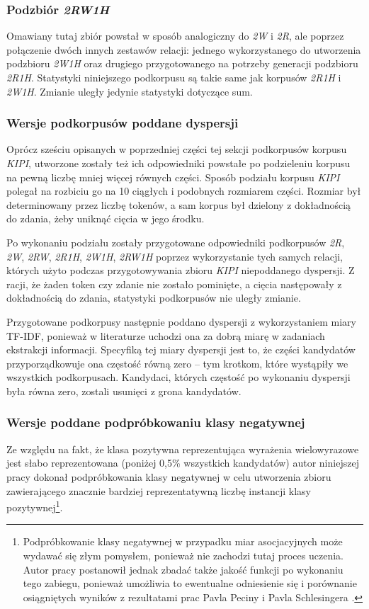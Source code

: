 \subsubsection{Podzbiór \protect\textit{2RW1H}}
Omawiany tutaj zbiór powstał w sposób analogiczny do \emph{2W} i \emph{2R}, ale poprzez połączenie dwóch innych zestawów relacji: jednego wykorzystanego do utworzenia podzbioru \emph{2W1H} oraz drugiego przygotowanego na potrzeby generacji podzbioru \emph{2R1H}.
Statystyki niniejszego podkorpusu są takie same jak korpusów \emph{2R1H} i \emph{2W1H}.
Zmianie uległy jedynie statystyki dotyczące sum.


\subsubsection{Wersje podkorpusów poddane dyspersji}
Oprócz sześciu opisanych w poprzedniej części tej sekcji podkorpusów korpusu \emph{KIPI}, utworzone zostały też ich odpowiedniki powstałe po podzieleniu korpusu na pewną liczbę mniej więcej równych części.
Sposób podziału korpusu \emph{KIPI} polegał na rozbiciu go na 10 ciągłych i podobnych rozmiarem części.
Rozmiar był determinowany przez liczbę tokenów, a sam korpus był dzielony z dokładnością do zdania, żeby uniknąć cięcia w jego środku.

\par
Po wykonaniu podziału zostały przygotowane odpowiedniki podkorpusów \emph{2R}, \emph{2W}, \emph{2RW}, \emph{2R1H}, \emph{2W1H}, \emph{2RW1H} poprzez wykorzystanie tych samych relacji, których użyto podczas przygotowywania zbioru \emph{KIPI} niepoddanego dyspersji.
Z racji, że żaden token czy zdanie nie zostało pominięte, a cięcia następowały z dokładnością do zdania, statystyki podkorpusów nie uległy zmianie.

\par
Przygotowane podkorpusy następnie poddano dyspersji z wykorzystaniem miary TF-IDF, ponieważ w literaturze uchodzi ona za dobrą miarę w zadaniach ekstrakcji informacji.
Specyfiką tej miary dyspersji jest to, że części kandydatów przyporządkowuje ona częstość równą zero -- tym krotkom, które wystąpiły we wszystkich podkorpusach.
Kandydaci, których częstość po wykonaniu dyspersji była równa zero, zostali usunięci z grona kandydatów.


\subsubsection{Wersje poddane podpróbkowaniu klasy negatywnej}
Ze względu na fakt, że klasa pozytywna reprezentująca wyrażenia wielowyrazowe jest słabo reprezentowana (poniżej 0,5\% wszystkich kandydatów) autor niniejszej pracy dokonał podpróbkowania klasy negatywnej w celu utworzenia zbioru zawierającego znacznie bardziej reprezentatywną liczbę instancji klasy pozytywnej\footnote{Podpróbkowanie klasy negatywnej w przypadku miar asocjacyjnych może wydawać się złym pomysłem, ponieważ nie zachodzi tutaj proces uczenia. Autor pracy postanowił jednak zbadać także jakość funkcji po wykonaniu tego zabiegu, ponieważ umożliwia to ewentualne odniesienie się i porównanie osiągniętych wyników z rezultatami prac Pavla Peciny i Pavla Schlesingera \cite{coling}.}.

